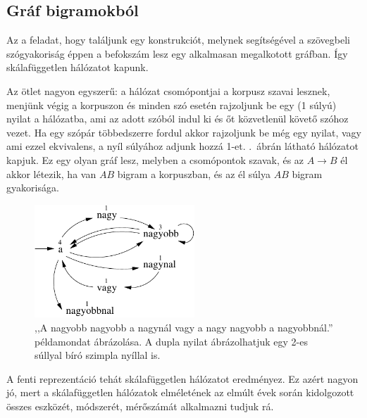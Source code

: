 \documentclass{llncs}
\newcommand{\matnyil}{\ensuremath{\rightarrow}}
\begin{document}
\subsection{Gráf bigramokból}
\label{sec:graph}

Az a feladat, hogy találjunk egy konstrukciót,
melynek segítségével a szövegbeli szógyakoriság
éppen a befokszám lesz egy alkalmasan megalkotott gráfban.
%
Így skálafüggetlen hálózatot kapunk.

Az ötlet nagyon egyszerű:
a hálózat csomópontjai a korpusz szavai lesznek,
menjünk végig a korpuszon és
minden szó esetén rajzoljunk be egy (1 súlyú) nyilat a hálózatba,
ami az adott szóból indul ki és őt közvetlenül követő szóhoz vezet.
%
Ha egy szópár többedszerre fordul akkor rajzoljunk be még egy nyilat,
vagy ami ezzel ekvivalens, a nyíl súlyához adjunk hozzá 1-et.
%
.\ ábrán látható hálózatot kapjuk.
%
Ez egy olyan gráf lesz, melyben a csomópontok szavak,
és az $A\matnyil B$ él akkor létezik, ha van $AB$ bigram a korpuszban,
és az él súlya $AB$ bigram gyakorisága.

\begin{figure}[ht]
\begin{center}
\includegraphics[width=6cm]{scfr_pelda.pdf}
\end{center}
\caption{,,A nagyobb nagyobb a nagynál vagy a nagy nagyobb a nagyobbnál.''
példamondat ábrázolása.
A dupla nyilat ábrázolhatjuk egy 2-es súllyal bíró szimpla nyíllal is.}
\label{fig:scfr_pelda}
\end{figure}

A fenti reprezentáció tehát skálafüggetlen hálózatot eredményez.
%
Ez azért nagyon jó, mert a skálafüggetlen hálózatok elméletének
az elmúlt évek során kidolgozott összes
eszközét, módszerét, mérőszámát
\cite{barabasi2009scalefree}
alkalmazni tudjuk rá.
\end{document}
